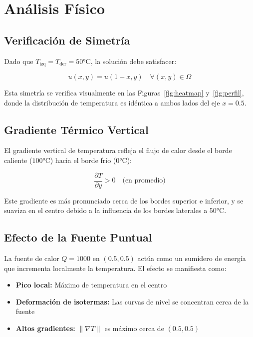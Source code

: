 \documentclass[12pt,a4paper]{article}
\theoremstyle{definition}
\newcommand{\norm}[1]{\|#1\|}
\newcommand{\diff}[2]{\frac{\partial #1}{\partial #2}}
\begin{document}
\section{An\'{a}lisis F\'{i}sico}\label{sec:analisis}

\subsection{Verificaci\'{o}n de Simetr\'{i}a}

Dado que $T_{\text{izq}} = T_{\text{der}} = 50\text{°C}$, la soluci\'{o}n debe satisfacer:

\begin{equation}\label{eq:simetria}
u(x, y) = u(1-x, y) \quad \forall (x,y) \in \Omega
\end{equation}

Esta simetr\'{i}a se verifica visualmente en las Figuras~\ref{fig:heatmap} y~\ref{fig:perfil}, donde la distribuci\'{o}n de temperatura es id\'{e}ntica a ambos lados del eje $x = 0.5$.

\subsection{Gradiente T\'{e}rmico Vertical}

El gradiente vertical de temperatura refleja el flujo de calor desde el borde caliente ($100\text{°C}$) hacia el borde fr\'{i}o ($0\text{°C}$):

\begin{equation}\label{eq:gradiente}
\diff{T}{y} > 0 \quad \text{(en promedio)}
\end{equation}

Este gradiente es m\'{a}s pronunciado cerca de los bordes superior e inferior, y se suaviza en el centro debido a la influencia de los bordes laterales a $50\text{°C}$.

\subsection{Efecto de la Fuente Puntual}

La fuente de calor $Q = 1000$ en $(0.5, 0.5)$ act\'{u}a como un sumidero de energ\'{i}a que incrementa localmente la temperatura. El efecto se manifiesta como:

\begin{itemize}
    \item \textbf{Pico local:} M\'{a}ximo de temperatura en el centro
    \item \textbf{Deformaci\'{o}n de isotermas:} Las curvas de nivel se concentran cerca de la fuente
    \item \textbf{Altos gradientes:} $\norm{\nabla T}$ es m\'{a}ximo cerca de $(0.5, 0.5)$
\end{itemize}
\end{document}
